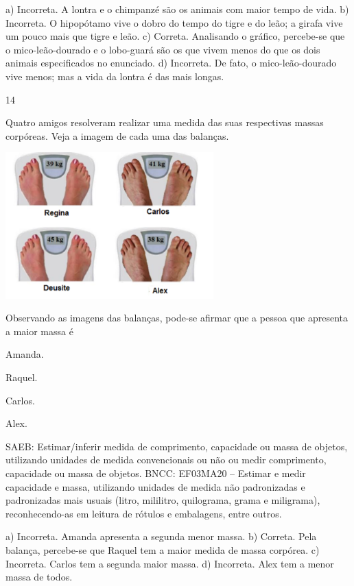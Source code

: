 \begin{multicols}{2}
{\begin{escolha}
{a) Incorreta. A lontra e o chimpanzé são os animais com maior tempo de vida.
b) Incorreta. O hipopótamo vive o dobro do tempo do tigre e do leão; a girafa vive um pouco mais que tigre e leão.
c) Correta. Analisando o gráfico, percebe-se que o mico-leão-dourado e o lobo-guará são os que vivem menos do que os dois animais especificados no enunciado.
d) Incorreta. De fato, o mico-leão-dourado vive menos; mas a vida da lontra é das mais longas.

\num{14}

Quatro amigos resolveram realizar uma medida das suas respectivas massas corpóreas. Veja a imagem de cada uma das balanças.


\includegraphics[width=3.15196in,height=2.22201in]{media/image128.png}

Observando as imagens das balanças, pode-se afirmar que a pessoa que apresenta a maior massa é

\begin{escolha}

\item
  Amanda.
\item
  Raquel.
\item
  Carlos.
\item
  Alex.
\end{escolha}


SAEB: Estimar/inferir medida de comprimento, capacidade ou
massa de objetos, utilizando unidades de medida convencionais ou não ou
medir comprimento, capacidade ou massa de objetos.
BNCC: EF03MA20 -- Estimar e medir capacidade e massa, utilizando unidades de medida não
padronizadas e padronizadas mais usuais (litro, mililitro, quilograma, grama e miligrama),
reconhecendo-as em leitura de rótulos e embalagens, entre outros.

a) Incorreta. Amanda apresenta a segunda menor massa.
b) Correta. Pela balança, percebe-se que Raquel tem a maior medida de massa corpórea.
c) Incorreta. Carlos tem a segunda maior massa.
d) Incorreta. Alex tem a menor massa de todos.

}
\end{escolha}}
\end{multicols}
